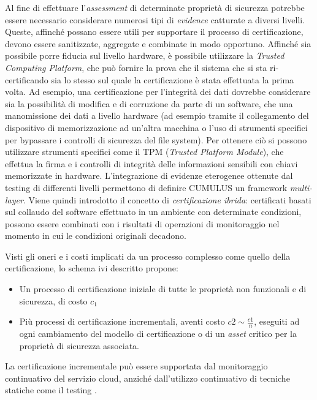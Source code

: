 \documentclass[../main.tex]{subfiles}
\begin{document}
Al fine di effettuare l'\textit{assessment} di determinate proprietà di sicurezza potrebbe essere necessario considerare numerosi tipi di \textit{evidence} catturate a diversi livelli. Queste, affinché possano essere utili per supportare il processo di certificazione, devono essere sanitizzate, aggregate e combinate in modo opportuno.
Affinché sia possibile porre fiducia sul livello hardware, è possibile utilizzare la \textit{Trusted Computing Platform}, che può fornire la prova che il sistema che si sta ri-certificando sia lo stesso sul quale la certificazione è stata effettuata la prima volta. 
Ad esempio, una certificazione per l'integrità dei dati dovrebbe considerare sia la possibilità di modifica e di corruzione da parte di un software, che una manomissione dei dati a livello hardware (ad esempio tramite il collegamento del dispositivo di memorizzazione ad un'altra macchina o l'uso di strumenti specifici per bypassare i controlli di sicurezza del file system).
Per ottenere ciò si possono utilizzare strumenti specifici come il TPM (\textit{Trusted Platform Module}), che effettua la firma e i controlli di integrità delle informazioni sensibili con chiavi memorizzate in hardware.
L'integrazione di evidenze eterogenee ottenute dal testing di differenti livelli permettono di definire CUMULUS un framework \textit{multi-layer}.
Viene quindi introdotto il concetto di \textit{certificazione ibrida}: certificati basati sul collaudo del software effettuato in un ambiente con determinate condizioni, possono essere combinati con i risultati di operazioni di monitoraggio nel momento in cui le condizioni originali decadono.\cite{SpanoudakisDamiani}

Visti gli oneri e i costi implicati da un processo complesso come quello della certificazione, lo schema ivi descritto propone:
\begin{itemize}
\item Un processo di certificazione iniziale di tutte le proprietà non funzionali e di sicurezza, di costo $c_1$
\item Più processi di certificazione incrementali, aventi costo $c2 \sim\frac{c1}{n}$, eseguiti ad ogni cambiamento del modello di certificazione o di un \textit{asset} critico per la proprietà di sicurezza associata.
\end{itemize}
La certificazione incrementale può essere supportata dal monitoraggio continuativo del servizio cloud, anziché dall'utilizzo continuativo di tecniche statiche come il testing \cite{Dempsey}.%
\end{document}
